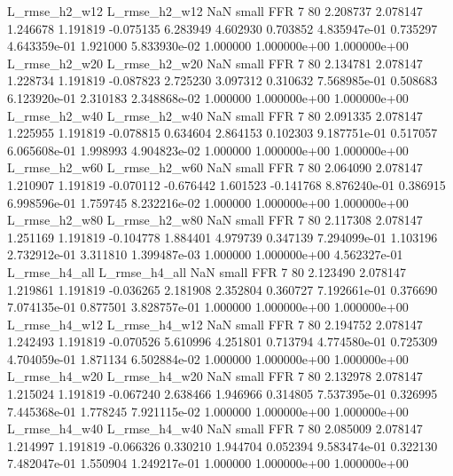  L_rmse_h2_w12  L_rmse_h2_w12                   NaN      small      FFR                 7 80 2.208737       2.078147 1.246678       1.191819   -0.075135      6.283949      4.602930     0.703852   4.835947e-01  0.735297 4.643359e-01     1.921000   5.833930e-02            1.000000    1.000000e+00        1.000000e+00
 L_rmse_h2_w20  L_rmse_h2_w20                   NaN      small      FFR                 7 80 2.134781       2.078147 1.228734       1.191819   -0.087823      2.725230      3.097312     0.310632   7.568985e-01  0.508683 6.123920e-01     2.310183   2.348868e-02            1.000000    1.000000e+00        1.000000e+00
 L_rmse_h2_w40  L_rmse_h2_w40                   NaN      small      FFR                 7 80 2.091335       2.078147 1.225955       1.191819   -0.078815      0.634604      2.864153     0.102303   9.187751e-01  0.517057 6.065608e-01     1.998993   4.904823e-02            1.000000    1.000000e+00        1.000000e+00
 L_rmse_h2_w60  L_rmse_h2_w60                   NaN      small      FFR                 7 80 2.064090       2.078147 1.210907       1.191819   -0.070112     -0.676442      1.601523    -0.141768   8.876240e-01  0.386915 6.998596e-01     1.759745   8.232216e-02            1.000000    1.000000e+00        1.000000e+00
 L_rmse_h2_w80  L_rmse_h2_w80                   NaN      small      FFR                 7 80 2.117308       2.078147 1.251169       1.191819   -0.104778      1.884401      4.979739     0.347139   7.294099e-01  1.103196 2.732912e-01     3.311810   1.399487e-03            1.000000    1.000000e+00        4.562327e-01
 L_rmse_h4_all  L_rmse_h4_all                   NaN      small      FFR                 7 80 2.123490       2.078147 1.219861       1.191819   -0.036265      2.181908      2.352804     0.360727   7.192661e-01  0.376690 7.074135e-01     0.877501   3.828757e-01            1.000000    1.000000e+00        1.000000e+00
 L_rmse_h4_w12  L_rmse_h4_w12                   NaN      small      FFR                 7 80 2.194752       2.078147 1.242493       1.191819   -0.070526      5.610996      4.251801     0.713794   4.774580e-01  0.725309 4.704059e-01     1.871134   6.502884e-02            1.000000    1.000000e+00        1.000000e+00
 L_rmse_h4_w20  L_rmse_h4_w20                   NaN      small      FFR                 7 80 2.132978       2.078147 1.215024       1.191819   -0.067240      2.638466      1.946966     0.314805   7.537395e-01  0.326995 7.445368e-01     1.778245   7.921115e-02            1.000000    1.000000e+00        1.000000e+00
 L_rmse_h4_w40  L_rmse_h4_w40                   NaN      small      FFR                 7 80 2.085009       2.078147 1.214997       1.191819   -0.066326      0.330210      1.944704     0.052394   9.583474e-01  0.322130 7.482047e-01     1.550904   1.249217e-01            1.000000    1.000000e+00        1.000000e+00
